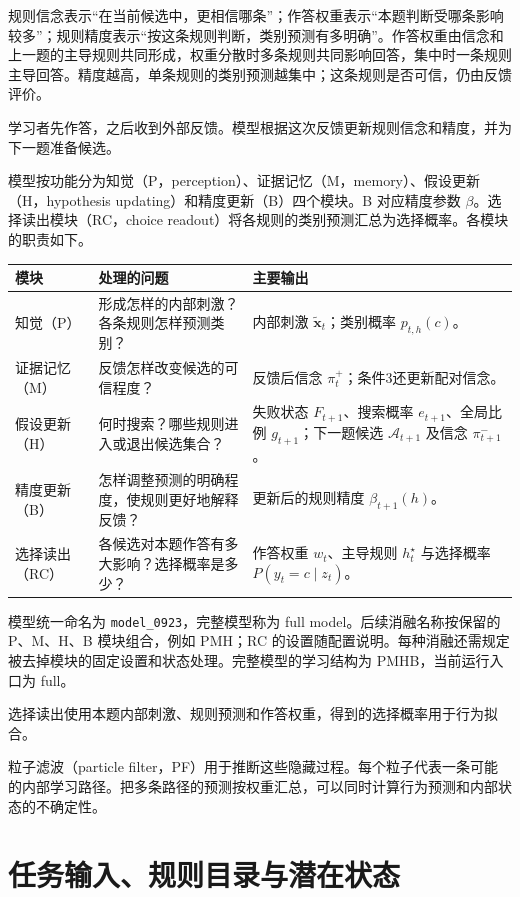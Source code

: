 \documentclass[12pt]{article}
\begin{document}
规则信念表示“在当前候选中，更相信哪条”；作答权重表示“本题判断受哪条影响较多”；规则精度表示“按这条规则判断，类别预测有多明确”。作答权重由信念和上一题的主导规则共同形成，权重分散时多条规则共同影响回答，集中时一条规则主导回答。精度越高，单条规则的类别预测越集中；这条规则是否可信，仍由反馈评价。

学习者先作答，之后收到外部反馈。模型根据这次反馈更新规则信念和精度，并为下一题准备候选。

模型按功能分为知觉（P，perception）、证据记忆（M，memory）、假设更新（H，hypothesis updating）和精度更新（B）四个模块。B 对应精度参数 $\beta$。选择读出模块（RC，choice readout）将各规则的类别预测汇总为选择概率。各模块的职责如下。

{\small
\begin{longtable}{L{2.8cm}L{5.4cm}L{6.0cm}}
\toprule
模块 & 处理的问题 & 主要输出\\
\midrule
\endhead
知觉（P） & 形成怎样的内部刺激？各条规则怎样预测类别？ & 内部刺激 $\widetilde{\bm x}_t$；类别概率 $p_{t,h}(c)$。\\
证据记忆（M） & 反馈怎样改变候选的可信程度？ & 反馈后信念 $\pi_t^+$；条件3还更新配对信念。\\
假设更新（H） & 何时搜索？哪些规则进入或退出候选集合？ & 失败状态 $F_{t+1}$、搜索概率 $e_{t+1}$、全局比例 $g_{t+1}$；下一题候选 $\mathcal A_{t+1}$ 及信念 $\pi_{t+1}^-$。\\
精度更新（B） & 怎样调整预测的明确程度，使规则更好地解释反馈？ & 更新后的规则精度 $\beta_{t+1}(h)$。\\
选择读出（RC） & 各候选对本题作答有多大影响？选择概率是多少？ & 作答权重 $w_t$、主导规则 $h_t^{\star}$ 与选择概率 $P(y_t=c\mid z_t)$。\\
\bottomrule
\end{longtable}
}

模型统一命名为 \texttt{model\_0923}，完整模型称为 full model。后续消融名称按保留的 P、M、H、B 模块组合，例如 PMH；RC 的设置随配置说明。每种消融还需规定被去掉模块的固定设置和状态处理。完整模型的学习结构为 PMHB，当前运行入口为 full。

选择读出使用本题内部刺激、规则预测和作答权重，得到的选择概率用于行为拟合。

粒子滤波（particle filter，PF）用于推断这些隐藏过程。每个粒子代表一条可能的内部学习路径。把多条路径的预测按权重汇总，可以同时计算行为预测和内部状态的不确定性。

\section{任务输入、规则目录与潜在状态}
\label{sec:states}
\end{document}
